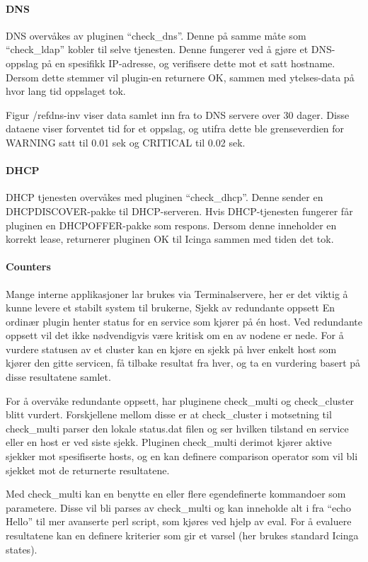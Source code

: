 \paragraph{DNS}

DNS overvåkes av pluginen “check\_dns”. Denne på samme måte som “check\_ldap” kobler til selve tjenesten. Denne fungerer ved å gjøre et DNS-oppslag på en spesifikk IP-adresse, og verifisere dette mot et satt hostname. Dersom dette stemmer vil plugin-en returnere OK, sammen med ytelses-data på hvor lang tid oppslaget tok.

Figur /ref{dns-inv} viser data samlet inn fra to DNS servere over 30 dager. Disse dataene viser forventet tid for et oppslag, og utifra dette ble grenseverdien for WARNING satt til 0.01 sek og CRITICAL til 0.02 sek.

\paragraph{DHCP}

DHCP tjenesten overvåkes med pluginen “check\_dhcp”. Denne sender en DHCPDISCOVER-pakke til DHCP-serveren. Hvis DHCP-tjenesten fungerer får pluginen en DHCPOFFER-pakke som respons. Dersom denne inneholder en korrekt lease, returnerer pluginen OK til Icinga sammen med tiden det tok.

\paragraph{Counters}
Mange interne applikasjoner lar brukes via Terminalservere, her er det viktig å kunne levere et stabilt system til brukerne, 
Sjekk av redundante oppsett
En ordinær plugin henter status for en service som kjører på én host. Ved redundante oppsett vil det ikke nødvendigvis være kritisk om en av nodene er nede. For å vurdere statusen av et cluster kan en kjøre en sjekk på hver enkelt host som kjører den gitte servicen, få tilbake resultat fra hver, og ta en vurdering basert på disse resultatene samlet.

For å overvåke redundante oppsett, har pluginene check\_multi og check\_cluster blitt vurdert.  Forskjellene mellom disse er at check\_cluster i motsetning til check\_multi parser den lokale status.dat filen og ser hvilken tilstand en service eller en host er ved siste sjekk. Pluginen check\_multi derimot kjører aktive sjekker mot spesifiserte hosts, og en kan definere comparison operator som vil bli sjekket mot de returnerte resultatene.

Med check\_multi kan en benytte en eller flere egendefinerte kommandoer som parametere. Disse vil bli parses av check\_multi og kan inneholde alt i fra “echo Hello” til mer avanserte perl script, som kjøres ved hjelp av eval. For å evaluere resultatene kan en definere kriterier som gir et varsel (her brukes standard Icinga states). 

